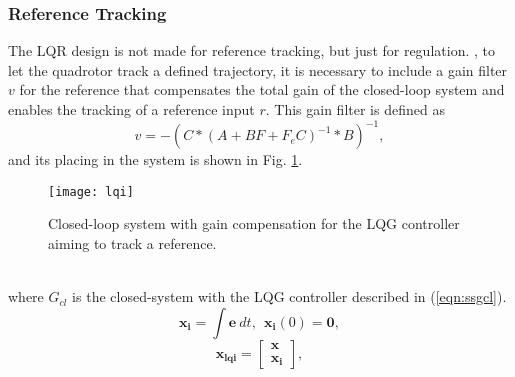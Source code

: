 \subsubsection{Reference Tracking}
The LQR design is not made for reference tracking, but just for regulation. 
, to let the quadrotor track a defined trajectory, it is necessary to include a gain filter $v$ for the reference that compensates the total gain of the closed-loop system and enables the tracking of a reference input $r$. This gain filter is defined as
	\begin{equation}\label{eqn:v}
	v = -(C*(A+BF+F_{e}C)^{-1}*B)^{-1},
	\end{equation}
and its placing in the system is shown in Fig. \ref{fig:lqi}.
	\begin{figure}[h]
	\begin{center}
	\texttt{[image: lqi]}
	\caption{Closed-loop system with gain compensation for the LQG controller aiming to track a reference.}
	\label{fig:lqi}
	\end{center}
	\end{figure}
\\where $G_{cl}$ is the closed-system with the LQG controller described in (\ref{eqn:ssgcl}).
\begin{equation}
\mathbf{x_i} = \int \mathbf{e}\ dt,\ \ \mathbf{x_i}(0) = \mathbf{0},
\end{equation}
\begin{equation}
\mathbf{x_{lqi}} = \begin{bmatrix}
\mathbf{x} \\
\mathbf{x_i}
\end{bmatrix},
\end{equation}
